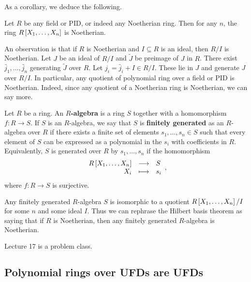 \pagebreak

As a corollary, we deduce the following.

\begin{corollary}
Let $ R $ be any field or PID, or indeed any Noetherian ring. Then for any $ n $, the ring $ R\sbr{X_1, \dots, X_n} $ is Noetherian.
\end{corollary}

An observation is that if $ R $ is Noetherian and $ I \subseteq R $ is an ideal, then $ R / I $ is Noetherian. Let $ J $ be an ideal of $ R / I $ and $ \widetilde{J} $ be preimage of $ J $ in $ R $. There exist $ \widetilde{j_1}, \dots, \widetilde{j_n} $ generating $ \widetilde{J} $ over $ R $. Let $ j_i = \widetilde{j_i} + I \in R / I $. These lie in $ J $ and generate $ J $ over $ R / I $. In particular, any quotient of polynomial ring over a field or PID is Noetherian. Indeed, since any quotient of a Noetherian ring is Noetherian, we can say more.

\begin{definition}
Let $ R $ be a ring. An \textbf{$ R $-algebra} is a ring $ S $ together with a homomorphism $ f : R \to S $. If $ S $ is an $ R $-algebra, we say that $ S $ is \textbf{finitely generated} as an $ R $-algebra over $ R $ if there exists a finite set of elements $ s_1, \dots, s_n \in S $ such that every element of $ S $ can be expressed as a polynomial in the $ s_i $ with coefficients in $ R $. Equivalently, $ S $ is generated over $ R $ by $ s_1, \dots, s_n $ if the homomorphism
$$ \function{R\sbr{X_1, \dots, X_n}}{S}{X_i}{s_i}, $$
where $ f : R \to S $ is surjective.
\end{definition}

\begin{note*}
Any finitely generated $ R $-algebra $ S $ is isomorphic to a quotient $ R\sbr{X_1, \dots, X_n} / I $ for some $ n $ and some ideal $ I $. Thus we can rephrase the Hilbert basis theorem as saying that if $ R $ is Noetherian, then any finitely generated $ R $-algebra is Noetherian.
\end{note*}


Lecture 17 is a problem class.

\subsection{Polynomial rings over UFDs are UFDs}


